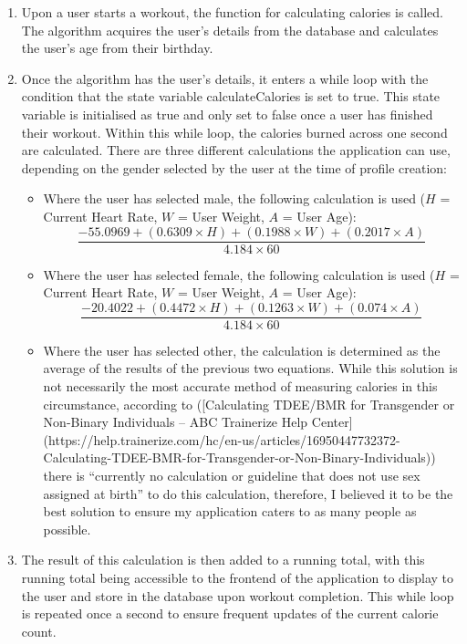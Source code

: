 \documentclass{l4proj}
\begin{document}
\begin{enumerate}
    \item Upon a user starts a workout, the function for calculating calories is called. The algorithm acquires the user’s details from the database and calculates the user’s age from their birthday.
    \item Once the algorithm has the user’s details, it enters a while loop with the condition that the state variable calculateCalories is set to true. This state variable is initialised as true and only set to false once a user has finished their workout. Within this while loop, the calories burned across one second are calculated. There are three different calculations the application can use, depending on the gender selected by the user at the time of profile creation:
    \begin{itemize}
        \item Where the user has selected male, the following calculation is used ($H$ = Current Heart Rate, $W$ = User Weight, $A$ = User Age):
        $$
            \frac{-55.0969 + (0.6309 \times H) + (0.1988 \times W) + (0.2017 \times A)}{4.184 \times 60}
        $$
        \item Where the user has selected female, the following calculation is used ($H$ = Current Heart Rate, $W$ = User Weight, $A$ = User Age):
        $$
            \frac{-20.4022 + (0.4472 \times H) + (0.1263 \times W) + (0.074 \times A)}{4.184 \times 60}
        $$
        \item Where the user has selected other, the calculation is determined as the average of the results of the previous two equations. While this solution is not necessarily the most accurate method of measuring calories in this circumstance, according to ([Calculating TDEE/BMR for Transgender or Non-Binary Individuals – ABC Trainerize Help Center](https://help.trainerize.com/hc/en-us/articles/16950447732372-Calculating-TDEE-BMR-for-Transgender-or-Non-Binary-Individuals)) there is “currently no calculation or guideline that does not use sex assigned at birth” to do this calculation, therefore, I believed it to be the best solution to ensure my application caters to as many people as possible.
    \end{itemize}

    \item The result of this calculation is then added to a running total, with this running total being accessible to the frontend of the application to display to the user and store in the database upon workout completion. This while loop is repeated once a second to ensure frequent updates of the current calorie count.
    
\end{enumerate}
\end{document}
